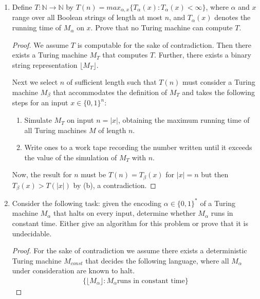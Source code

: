 \documentclass[usletter]{article}
\begin{document}
\begin{enumerate}
\begin{proof}
      So our Turing machine $M_h$ simulates $M_f$ then $M_g$ and then multiplies the two results and we have shown that this is $O(f(n) \cdot g(n))$.

    \end{proof}

  \item Define $T : \mathbb{N} \rightarrow \mathbb{N}$ by $T(n) = max_{\alpha,x}\{T_{\alpha}(x) : T_{\alpha}(x) < \infty \}$, where $\alpha$ and $x$ range over all Boolean strings of length at most $n$, and $T_{\alpha}(x)$ denotes the running time of $M_{\alpha}$ on $x$. Prove that no Turing machine can compute $T$.

    \begin{proof}
      We assume $T$ is computable for the sake of contradiction. Then there exists a Turing machine $M_T$ that computes $T$. Further, there exists a binary string representation $\lfloor M_T \rfloor$.

      Next we select $n$ of sufficient length such that $T(n)$ must consider a Turing machine $M_{\beta}$ that accommodates the definition of $M_T$ and takes the following steps for an input $x \in \{0,1\}^n$:
      \begin{enumerate}
        \item Simulate $M_T$ on input $n = |x|$, obtaining the maximum running time of all Turing machines $M$ of length $n$.
        \item Write ones to a work tape recording the number written until it exceeds the value of the simulation of $M_T$ with $n$.
      \end{enumerate}

      Now, the result for $n$ must be $T(n) = T_{\beta}(x)$ for $|x| = n$ but then $T_{\beta}(x) > T(|x|)$ by (b), a contradiction.
    \end{proof}

  \item Consider the following task: given the encoding $\alpha \in \{0,1\}^*$ of a Turing machine $M_{\alpha}$ that halts on every input, determine whether $M_{\alpha}$ runs in constant time. Either give an algorithm for this problem or prove that it is undecidable.

      \begin{proof}
        For the sake of contradiction we assume there exists a deterministic Turing machine $M_{const}$ that decides the following language, where all $M_{\alpha}$ under consideration are known to halt.
        \begin{align}
          \{ \lfloor M_{\alpha} \rfloor : M_{\alpha} \text{runs in constant time} \}
        \end{align}


\end{proof}
\end{enumerate}
\end{document}
